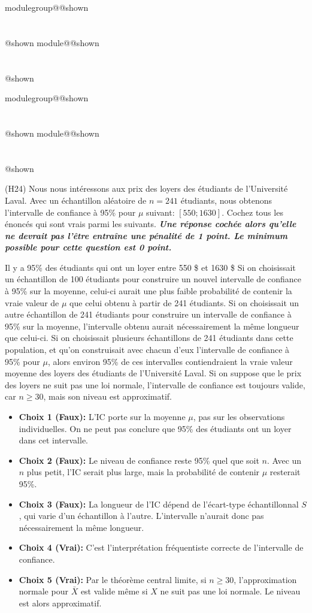 \documentclass{Evaluation}
\makeatletter
\newcommand{\currentmodulekey}{}
\newcommand{\currentmoduletitle}{}
\newcommand{\currentgroupkey}{}
\newcommand{\currentgrouptitle}{}
\newcommand{\showmoduleifneeded}{%
  \ifx\currentgroupkey\empty\else
    \expandafter\ifx\csname modulegroup@\currentgroupkey @shown\endcsname\relax
      \section*{\currentgrouptitle}%
      \expandafter\gdef\csname modulegroup@\currentgroupkey @shown\endcsname{1}%
    \fi
  \fi
  \expandafter\ifx\csname module@\currentmodulekey @shown\endcsname\relax
    \section*{\currentmoduletitle}%
    \expandafter\gdef\csname module@\currentmodulekey @shown\endcsname{1}%
  \fi
}
\newenvironment{H24}{\showmoduleifneeded}{}
\newenvironment{A25}{\showmoduleifneeded}{}
\makeatother
\begin{document}
\begin{questions}
\begin{A25}
\begin{parts}
\begin{solution}
    \end{solution}
\end{parts}

\end{A25}
\begin{H24}
\question (H24) Nous nous intéressons aux prix des loyers des étudiants de l'Université Laval. 
Avec un échantillon aléatoire de $n=241$ étudiants, nous obtenons l'intervalle de confiance à 95\%  pour $\mu$ suivant: $[550;1630]$. 
Cochez tous les énoncés qui sont vrais parmi les suivants. \textit{\textbf{Une réponse cochée alors qu'elle ne devrait pas l'être entraîne une pénalité de 1 point. Le minimum possible pour cette question est 0 point.}}
 
\begin{checkboxes}
\choice Il y a 95\% des étudiants qui ont un loyer entre 550 \$ et 1630 \$
\choice Si on choisissait un échantillon de 100 étudiants pour construire un nouvel intervalle de confiance à 95\% sur la moyenne, celui-ci aurait une plus faible probabilité de contenir la vraie valeur de $\mu$ que celui obtenu à partir de 241 étudiants.
\choice Si on choisissait un autre échantillon de 241 étudiants pour construire un intervalle de confiance à 95\% sur la moyenne, l'intervalle obtenu aurait nécessairement la même longueur que celui-ci.
\correctchoice Si on choisissait plusieurs échantillons de 241 étudiants dans cette population, et qu'on construisait avec chacun d'eux l'intervalle de confiance à 95\% pour $\mu$, alors environ 95\% de ces intervalles contiendraient la vraie valeur moyenne des loyers des étudiants de l'Université Laval. 
\correctchoice Si on suppose que le prix des loyers ne suit pas une loi normale, l'intervalle de confiance est toujours valide, car $n\geq 30$, mais son niveau est approximatif.
\end{checkboxes}
\begin{solution}
\begin{itemize}
    \item \textbf{Choix 1 (Faux):} L'IC porte sur la moyenne $\mu$, pas sur les observations individuelles. On ne peut pas conclure que 95\% des étudiants ont un loyer dans cet intervalle.
    \item \textbf{Choix 2 (Faux):} Le niveau de confiance reste 95\% quel que soit $n$. Avec un $n$ plus petit, l'IC serait plus large, mais la probabilité de contenir $\mu$ resterait 95\%.
    \item \textbf{Choix 3 (Faux):} La longueur de l'IC dépend de l'écart-type échantillonnal $S$, qui varie d'un échantillon à l'autre. L'intervalle n'aurait donc pas nécessairement la même longueur.
    \item \textbf{Choix 4 (Vrai):} C'est l'interprétation fréquentiste correcte de l'intervalle de confiance.
    \item \textbf{Choix 5 (Vrai):} Par le théorème central limite, si $n \geq 30$, l'approximation normale pour $\bar{X}$ est valide même si $X$ ne suit pas une loi normale. Le niveau est alors approximatif.
\end{itemize}
\end{solution}
\end{H24}


\end{questions}
\end{document}
